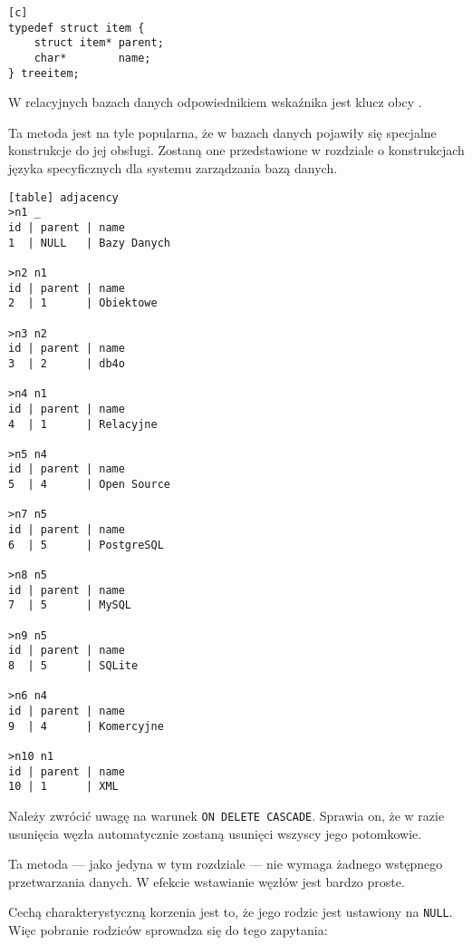 \begin{verbatim}[c]
typedef struct item {
    struct item* parent;
    char*        name;
} treeitem;
\end{verbatim}

W relacyjnych bazach danych odpowiednikiem wskaźnika jest klucz obcy%
. 


Ta metoda jest na tyle popularna, że w bazach danych pojawiły się specjalne konstrukcje do jej obsługi. 
Zostaną one przedstawione w rozdziale  o konstrukcjach języka specyficznych dla systemu zarządzania bazą danych.



\begin{verbatim}[table] adjacency
>n1 _
id | parent | name
1  | NULL   | Bazy Danych

>n2 n1
id | parent | name
2  | 1      | Obiektowe

>n3 n2
id | parent | name
3  | 2      | db4o

>n4 n1
id | parent | name
4  | 1      | Relacyjne

>n5 n4
id | parent | name
5  | 4      | Open Source

>n7 n5
id | parent | name
6  | 5      | PostgreSQL

>n8 n5
id | parent | name
7  | 5      | MySQL

>n9 n5
id | parent | name
8  | 5      | SQLite

>n6 n4
id | parent | name
9  | 4      | Komercyjne

>n10 n1
id | parent | name
10 | 1      | XML

\end{verbatim}



Należy zwrócić uwagę na warunek \texttt{ON DELETE CASCADE}. 
Sprawia on, że w razie usunięcia węzła  
automatycznie zostaną usunięci wszyscy jego potomkowie.



Ta metoda --- jako jedyna w tym rozdziale --- nie wymaga żadnego wstępnego przetwarzania danych.
W efekcie wstawianie węzłów jest bardzo proste.




Cechą charakterystyczną korzenia jest to, że jego rodzic jest ustawiony na \texttt{NULL}.
Więc pobranie rodziców sprowadza się do tego zapytania:



